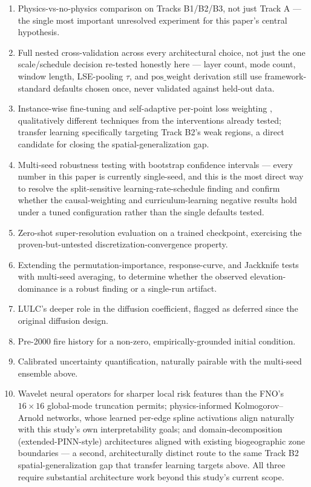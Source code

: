 \documentclass[journal]{IEEEtran}
\begin{document}
\begin{enumerate}
\item Physics-vs-no-physics comparison on Tracks B1/B2/B3, not just Track A --- the single most important unresolved experiment for this paper's central hypothesis.
\item Full nested cross-validation across every architectural choice, not just the one scale/schedule decision re-tested honestly here --- layer count, mode count, window length, LSE-pooling $\tau$, and $\mathrm{pos\_weight}$ derivation still use framework-standard defaults chosen once, never validated against held-out data.
\item Instance-wise fine-tuning \cite{li2023pino} and self-adaptive per-point loss weighting \cite{mcclenny2020}, qualitatively different techniques from the interventions already tested; transfer learning specifically targeting Track B2's weak regions, a direct candidate for closing the spatial-generalization gap.
\item Multi-seed robustness testing with bootstrap confidence intervals --- every number in this paper is currently single-seed, and this is the most direct way to resolve the split-sensitive learning-rate-schedule finding and confirm whether the causal-weighting and curriculum-learning negative results hold under a tuned configuration rather than the single defaults tested.
\item Zero-shot super-resolution evaluation on a trained checkpoint, exercising the proven-but-untested discretization-convergence property.
\item Extending the permutation-importance, response-curve, and Jackknife tests with multi-seed averaging, to determine whether the observed elevation-dominance is a robust finding or a single-run artifact.
\item LULC's deeper role in the diffusion coefficient, flagged as deferred since the original diffusion design.
\item Pre-2000 fire history for a non-zero, empirically-grounded initial condition.
\item Calibrated uncertainty quantification, naturally pairable with the multi-seed ensemble above.
\item Wavelet neural operators \cite{tripura2022} for sharper local risk features than the FNO's $16\times16$ global-mode truncation permits; physics-informed Kolmogorov--Arnold networks, whose learned per-edge spline activations align naturally with this study's own interpretability goals; and domain-decomposition (extended-PINN-style) architectures aligned with existing biogeographic zone boundaries --- a second, architecturally distinct route to the same Track B2 spatial-generalization gap that transfer learning targets above. All three require substantial architecture work beyond this study's current scope.
\end{enumerate}
\end{document}
